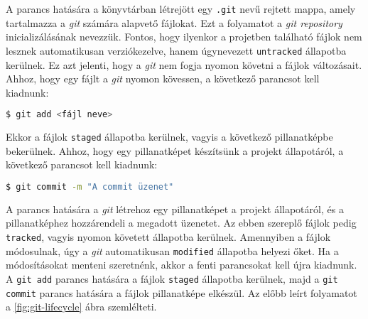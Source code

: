A parancs hatására a könyvtárban létrejött egy \texttt{.git} nevű rejtett
mappa, amely tartalmazza a \textit{git} számára alapvető fájlokat.
Ezt a folyamatot a \textit{git repository} inicializálásának nevezzük.
Fontos, hogy ilyenkor a projetben található fájlok nem lesznek
automatikusan verziókezelve, hanem úgynevezett \texttt{untracked} állapotba
kerülnek. Ez azt jelenti, hogy a \textit{git} nem fogja nyomon követni a
fájlok változásait. Ahhoz, hogy egy fájlt a \textit{git} nyomon kövessen,
a következő parancsot kell kiadnunk:

\begin{lstlisting}[caption={Fájlok hozzáadása},language=sh]
  $ git add <fájl neve>
\end{lstlisting}

Ekkor a fájlok \texttt{staged} állapotba kerülnek, vagyis a következő
pillanatképbe bekerülnek. Ahhoz, hogy egy pillanatképet készítsünk a
projekt állapotáról, a következő parancsot kell kiadnunk:

\begin{lstlisting}[caption={Pillanatkép mentése},language=sh]
  $ git commit -m "A commit üzenet"
\end{lstlisting}

A parancs hatására a \textit{git} létrehoz egy pillanatképet a projekt
állapotáról, és a pillanatképhez hozzárendeli a megadott üzenetet. Az ebben
szereplő fájlok pedig \texttt{tracked}, vagyis nyomon követett állapotba
kerülnek. Amennyiben a fájlok módosulnak, úgy a \textit{git} automatikusan
\texttt{modified} állapotba helyezi őket. Ha a módosításokat menteni
szeretnénk, akkor a fenti parancsokat kell újra kiadnunk. A \texttt{git add}
parancs hatására a fájlok \texttt{staged} állapotba kerülnek, majd a
\texttt{git commit} parancs hatására a fájlok pillanatképe elkészül.
Az előbb leírt folyamatot a \ref{fig:git-lifecycle} ábra szemlélteti.

